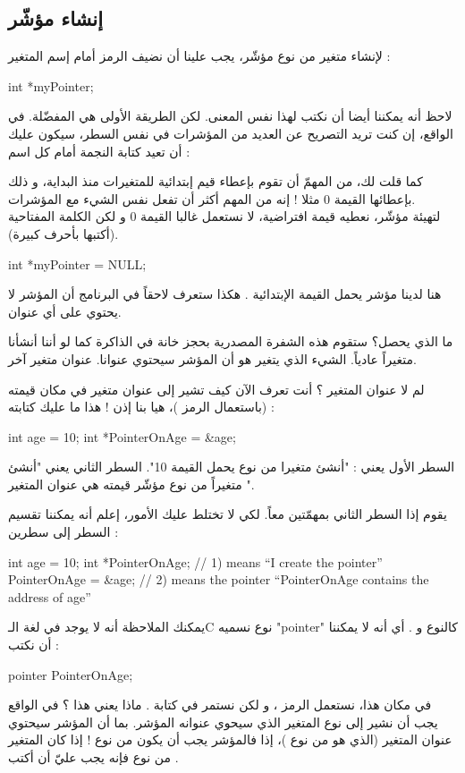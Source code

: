 \subsection{إنشاء مؤشّر}
لإنشاء متغير من نوع مؤشّر، يجب علينا أن نضيف الرمز
\InlineCode{*}
أمام إسم المتغير :
\begin{Csource}
int *myPointer;
\end{Csource}
\begin{information}
	لاحظ أنه يمكننا أيضا أن نكتب
لهذا نفس المعنى. لكن الطريقة الأولى هي المفضّلة. في الواقع، إن كنت تريد التصريح عن العديد من المؤشرات في نفس السطر، سيكون عليك أن تعيد كتابة النجمة أمام كل اسم :
\end{information}
كما قلت لك، من المهمّ أن تقوم بإعطاء قيم إبتدائية للمتغيرات منذ البداية، و ذلك بإعطائها القيمة 0 مثلا ! إنه من المهم أكثر أن تفعل نفس الشيء مع المؤشرات.\\
لتهيئة مؤشّر، نعطيه قيمة افتراضية، لا نستعمل غالبا القيمة 0 و لكن الكلمة المفتاحية
(أكتبها بأحرف كبيرة).
\begin{Csource}
int *myPointer = NULL;
\end{Csource}
هنا لدينا مؤشر يحمل القيمة الإبتدائية
.
هكذا ستعرف لاحقاً في البرنامج أن المؤشر لا يحتوي على أي عنوان.

ما الذي يحصل؟ ستقوم هذه الشفرة المصدرية بحجز خانة في الذاكرة كما لو أننا أنشأنا متغيراً عادياً. الشيء الذي يتغير هو أن المؤشر سيحتوي عنوانا. عنوان متغير آخر.

لم لا عنوان المتغير
؟ أنت تعرف الآن كيف تشير إلى عنوان متغير في مكان قيمته (باستعمال الرمز
\InlineCode{\&})،
هيا بنا إذن ! هذا ما عليك كتابته :
\begin{Csource}
int age = 10;
int *PointerOnAge = &age;
\end{Csource}
السطر الأول يعني : "أنشئ متغيرا من نوع
يحمل القيمة 10". السطر الثاني يعني "أنشئ متغيراً من نوع مؤشّر قيمته هي عنوان المتغير
".

يقوم إذا السطر الثاني بمهمّتين معاً. لكي لا تختلط عليك الأمور، إعلم أنه يمكننا تقسيم السطر إلى سطرين :
\begin{Csource}
int age = 10;
int *PointerOnAge; // 1) means “I create the pointer”
PointerOnAge = &age; // 2) means the pointer “PointerOnAge contains the address of age”
\end{Csource}
يمكنك الملاحظة أنه لا يوجد في لغة الـ\textenglish{C}
نوع نسميه
"\textenglish{pointer}"
كالنوع
و
.
أي أنه لا يمكننا أن نكتب :
\begin{Csource}
pointer PointerOnAge;
\end{Csource}
في مكان هذا، نستعمل الرمز
\InlineCode{*}
، و لكن نستمر في كتابة
.
ماذا يعني هذا ؟ في الواقع يجب أن نشير إلى نوع المتغير الذي سيحوي عنوانه المؤشر. بما أن المؤشر
سيحتوي عنوان المتغير
(الذي هو من نوع
)،
إذا فالمؤشر يجب أن يكون من نوع
! إذا كان المتغير من نوع
فإنه يجب عليّ أن أكتب
.

